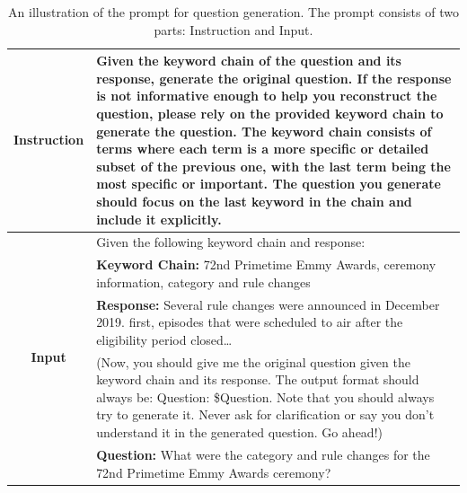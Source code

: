 \documentclass[11pt]{article}
\begin{document}
\begin{table}[h]
\centering
\begin{tabular}{c p{12cm}}
\toprule
\multirow{7}{*}{\textbf{Instruction}} & Given the keyword chain of the question and its response, generate the original question. If the response is not informative enough to help you reconstruct the question, please rely on the provided keyword chain to generate the question. The keyword chain consists of terms where each term is a more specific or detailed subset of the previous one, with the last term being the most specific or important. The question you generate should focus on the last keyword in the chain and include it explicitly. \\  \midrule

\multirow{9}{*}{\textbf{Input}} & Given the following keyword chain and response: \\
& \textbf{Keyword Chain:} 72nd Primetime Emmy Awards, ceremony information, category and rule changes  \\
& \textbf{Response:} Several rule changes were announced in December 2019. first, episodes that were scheduled to air after the eligibility period closed\dots \\
&(Now, you should give me the original question given the keyword chain and its response. The output format should always be: Question: \$Question. Note that you should always try to generate it. Never ask for clarification or say you don't understand it in the generated question. Go ahead!) \\
\midrule

\multirow{2}{*}{\textbf{Model Output}} & \textbf{Question:} What were the category and rule changes for the 72nd Primetime Emmy Awards ceremony? \\
\bottomrule

\end{tabular}
\caption{An illustration of the prompt for question generation. The prompt consists of two parts: Instruction and Input.}
\label{prompt_of_generating_question}
\end{table}
\end{document}
